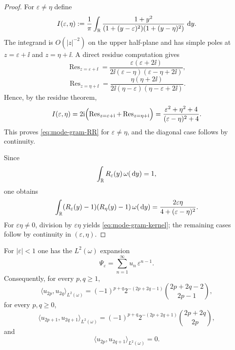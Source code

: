 \begin{proof}
For $\varepsilon\neq\eta$ define
\[
I(\varepsilon,\eta)
:=\frac{1}{\pi}\int_{\mathbb{R}}
\frac{1+y^2}{(1+(y-\varepsilon)^2)(1+(y-\eta)^2)}\,\,\mathrm{d} y.
\]
The integrand is $O(|z|^{-2})$ on the upper half-plane and has simple
poles at $z=\varepsilon+\ii$ and $z=\eta+\ii$.  A direct residue
computation gives
\[
\operatorname{Res}_{z=\varepsilon+\ii}
=\frac{\varepsilon(\varepsilon+2\ii)}
{2\ii(\varepsilon-\eta)(\varepsilon-\eta+2\ii)},
\]
\[
\operatorname{Res}_{z=\eta+\ii}
=\frac{\eta(\eta+2\ii)}
{2\ii(\eta-\varepsilon)(\eta-\varepsilon+2\ii)}.
\]
Hence, by the residue theorem,
\[
I(\varepsilon,\eta)
=2\mathrm{i}\Bigl(
\operatorname{Res}_{z=\varepsilon+\mathrm{i}}
+\operatorname{Res}_{z=\eta+\mathrm{i}}
\Bigr)
=\frac{\varepsilon^2+\eta^2+4}{(\varepsilon-\eta)^2+4}.
\]
This proves \eqref{eq:mode-gram-RR} for $\varepsilon\neq\eta$, and the
diagonal case follows by continuity.

Since
\[
\int_{\mathbb{R}}R_\varepsilon(y)\,\omega(\,\mathrm{d} y)=1,
\]
one obtains
\[
\int_{\mathbb{R}}(R_\varepsilon(y)-1)(R_\eta(y)-1)\,\omega(\,\mathrm{d} y)
=\frac{2\varepsilon\eta}{4+(\varepsilon-\eta)^2}.
\]
For $\varepsilon\eta\neq 0$, division by $\varepsilon\eta$ yields
\eqref{eq:mode-gram-kernel}; the remaining cases follow by continuity in
$(\varepsilon,\eta)$.
\end{proof}

\begin{corollary}%
\label{cor:mode-quadratic-integrals}
For $|\varepsilon|<1$ one has the $L^2(\omega)$ expansion
\[
\Psi_\varepsilon
=\sum_{n=1}^{\infty}u_n\,\varepsilon^{n-1}.
\]
Consequently, for every $p,q\ge 1$,
\[
\langle u_{2p},u_{2q}\rangle_{L^2(\omega)}
=(-1)^{p+q}2^{-(2p+2q-1)}
\binom{2p+2q-2}{2p-1},
\]
for every $p,q\ge 0$,
\[
\langle u_{2p+1},u_{2q+1}\rangle_{L^2(\omega)}
=(-1)^{p+q}2^{-(2p+2q+1)}
\binom{2p+2q}{2p},
\]
and
\[
\langle u_{2p},u_{2q+1}\rangle_{L^2(\omega)}=0.
\]
\end{corollary}

